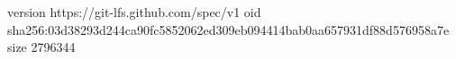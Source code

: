 version https://git-lfs.github.com/spec/v1
oid sha256:03d38293d244ca90fc5852062ed309eb094414bab0aa657931df88d576958a7e
size 2796344
